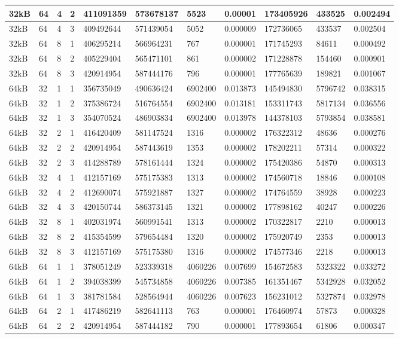 \documentclass[conference]{IEEEtran}
\begin{document}
\begin{table}
\begin{tabular}{|m{.75cm} |m{.75cm} |m{.8cm} | m{.75cm} | l | l | l | l | l | l | l |}
32kB&64&4&2&411091359&573678137&5523&0.00001&173405926&433525&0.002494\\ \hline
32kB&64&4&3&409492644&571439054&5052&0.000009&172736065&433537&0.002504\\ \hline
32kB&64&8&1&406295214&566964231&767&0.000001&171745293&84611&0.000492\\ \hline
32kB&64&8&2&405229404&565471101&861&0.000002&171228878&154460&0.000901\\ \hline
32kB&64&8&3&420914954&587444176&796&0.000001&177765639&189821&0.001067\\ \hline
64kB&32&1&1&356735049&490636424&6902400&0.013873&145494830&5796742&0.038315\\ \hline
64kB&32&1&2&375386724&516764554&6902400&0.013181&153311743&5817134&0.036556\\ \hline
64kB&32&1&3&354070524&486903834&6902400&0.013978&144378103&5793854&0.038581\\ \hline
64kB&32&2&1&416420409&581147524&1316&0.000002&176322312&48636&0.000276\\ \hline
64kB&32&2&2&420914954&587443619&1353&0.000002&178202211&57314&0.000322\\ \hline
64kB&32&2&3&414288789&578161444&1324&0.000002&175420386&54870&0.000313\\ \hline
64kB&32&4&1&412157169&575175383&1313&0.000002&174560718&18846&0.000108\\ \hline
64kB&32&4&2&412690074&575921887&1327&0.000002&174764559&38928&0.000223\\ \hline
64kB&32&4&3&420150744&586373145&1321&0.000002&177898162&40247&0.000226\\ \hline
64kB&32&8&1&402031974&560991541&1313&0.000002&170322817&2210&0.000013\\ \hline
64kB&32&8&2&415354599&579654484&1320&0.000002&175920749&2353&0.000013\\ \hline
64kB&32&8&3&412157169&575175380&1316&0.000002&174577346&2218&0.000013\\ \hline
64kB&64&1&1&378051249&523339318&4060226&0.007699&154672583&5323322&0.033272\\ \hline
64kB&64&1&2&394038399&545734858&4060226&0.007385&161351467&5342928&0.032052\\ \hline
64kB&64&1&3&381781584&528564944&4060226&0.007623&156231012&5327874&0.032978\\ \hline
64kB&64&2&1&417486219&582641113&763&0.000001&176460974&57873&0.000328\\ \hline
64kB&64&2&2&420914954&587444182&790&0.000001&177893654&61806&0.000347\\ \hline

\end{tabular}
\end{table}
\end{document}
